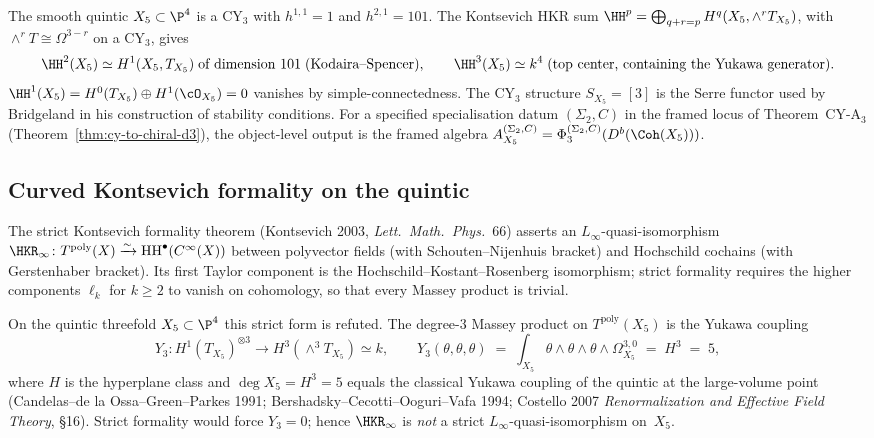 \begin{example}[Quintic threefold, \texorpdfstring{$d = 3$}{d = 3}]
\label{ex:quintic-derived}
The smooth quintic $X_5 \subset \P^4$ is a CY$_3$ with $h^{1,1} = 1$ and $h^{2,1} = 101$. The Kontsevich HKR sum $\HH^p = \bigoplus_{q+r=p} H^q(X_5, \wedge^r T_{X_5})$, with $\wedge^r T \cong \Omega^{3-r}$ on a CY$_3$, gives
\[
 \HH^2(X_5) \simeq H^1(X_5, T_{X_5}) \;\text{of dimension } 101 \;\text{(Kodaira--Spencer)}, \qquad
 \HH^3(X_5) \simeq k^4 \;\text{(top center, containing the Yukawa generator)}.
\]
$\HH^1(X_5) = H^0(T_{X_5}) \oplus H^1(\cO_{X_5}) = 0$ vanishes by simple-connectedness.
The CY$_3$ structure $S_{X_5} = [3]$ is the Serre functor used by Bridgeland in his construction of stability conditions. For a specified specialisation datum $(\Sigma_2,C)$ in the framed locus of Theorem~CY-A$_3$ (Theorem~\ref{thm:cy-to-chiral-d3}), the object-level output is the framed algebra $A_{X_5}^{(\Sigma_2,C)}=\Phi_3^{(\Sigma_2,C)}(D^b(\Coh(X_5)))$.
\end{example}

\subsection{Curved Kontsevich formality on the quintic}
\label{subsec:curved-formality-quintic}

The strict Kontsevich formality theorem (Kontsevich 2003, \textit{Lett.~Math.~Phys.}~66) asserts an $L_\infty$-quasi-isomorphism
$
 \HKR_\infty \colon T^{\mathrm{poly}}(X) \xrightarrow{\sim} \mathrm{HH}^\bullet(C^\infty(X))
$
between polyvector fields (with Schouten--Nijenhuis bracket) and Hochschild cochains (with Gerstenhaber bracket). Its first Taylor component is the Hochschild--Kostant--Rosenberg isomorphism; strict formality requires the higher components $\ell_k$ for $k \geq 2$ to vanish on cohomology, so that every Massey product is trivial.

On the quintic threefold $X_5 \subset \P^4$ this strict form is refuted. The degree-$3$ Massey product on $T^{\mathrm{poly}}(X_5)$ is the Yukawa coupling
\[
 Y_3 \colon H^1(T_{X_5})^{\otimes 3} \longrightarrow H^3(\wedge^3 T_{X_5}) \simeq k,
 \qquad
 Y_3(\theta, \theta, \theta) \;=\; \int_{X_5} \theta \wedge \theta \wedge \theta \wedge \Omega_{X_5}^{3,0} \;=\; H^3 \;=\; 5,
\]
where $H$ is the hyperplane class and $\deg X_5 = H^3 = 5$ equals the classical Yukawa coupling of the quintic at the large-volume point (Candelas--de la Ossa--Green--Parkes 1991; Bershadsky--Cecotti--Ooguri--Vafa 1994; Costello 2007 \textit{Renormalization and Effective Field Theory}, \S16). Strict formality would force $Y_3 = 0$; hence $\HKR_\infty$ is \emph{not} a strict $L_\infty$-quasi-isomorphism on~$X_5$.

